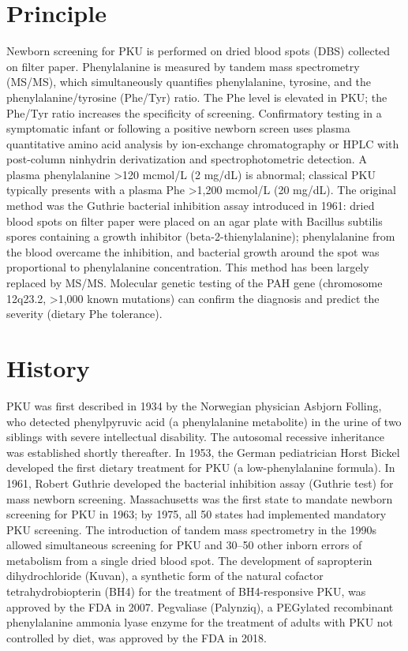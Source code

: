 \section*{Principle}
Newborn screening for PKU is performed on dried blood spots (DBS) collected on filter paper. Phenylalanine is measured by tandem mass spectrometry (MS/MS), which simultaneously quantifies phenylalanine, tyrosine, and the phenylalanine/tyrosine (Phe/Tyr) ratio. The Phe level is elevated in PKU; the Phe/Tyr ratio increases the specificity of screening. Confirmatory testing in a symptomatic infant or following a positive newborn screen uses plasma quantitative amino acid analysis by ion-exchange chromatography or HPLC with post-column ninhydrin derivatization and spectrophotometric detection. A plasma phenylalanine >120 mcmol/L (2 mg/dL) is abnormal; classical PKU typically presents with a plasma Phe >1,200 mcmol/L (20 mg/dL). The original method was the Guthrie bacterial inhibition assay introduced in 1961: dried blood spots on filter paper were placed on an agar plate with Bacillus subtilis spores containing a growth inhibitor (beta-2-thienylalanine); phenylalanine from the blood overcame the inhibition, and bacterial growth around the spot was proportional to phenylalanine concentration. This method has been largely replaced by MS/MS. Molecular genetic testing of the PAH gene (chromosome 12q23.2, >1,000 known mutations) can confirm the diagnosis and predict the severity (dietary Phe tolerance).

\section*{History}
PKU was first described in 1934 by the Norwegian physician Asbjorn Folling, who detected phenylpyruvic acid (a phenylalanine metabolite) in the urine of two siblings with severe intellectual disability. The autosomal recessive inheritance was established shortly thereafter. In 1953, the German pediatrician Horst Bickel developed the first dietary treatment for PKU (a low-phenylalanine formula). In 1961, Robert Guthrie developed the bacterial inhibition assay (Guthrie test) for mass newborn screening. Massachusetts was the first state to mandate newborn screening for PKU in 1963; by 1975, all 50 states had implemented mandatory PKU screening. The introduction of tandem mass spectrometry in the 1990s allowed simultaneous screening for PKU and 30--50 other inborn errors of metabolism from a single dried blood spot. The development of sapropterin dihydrochloride (Kuvan), a synthetic form of the natural cofactor tetrahydrobiopterin (BH4) for the treatment of BH4-responsive PKU, was approved by the FDA in 2007. Pegvaliase (Palynziq), a PEGylated recombinant phenylalanine ammonia lyase enzyme for the treatment of adults with PKU not controlled by diet, was approved by the FDA in 2018.

